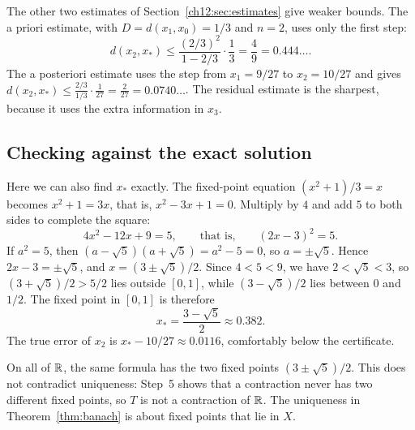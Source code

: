 The other two estimates of Section~\ref{ch12:sec:estimates} give weaker bounds. The a priori estimate, with $D=d(x_1,x_0)=1/3$ and $n=2$, uses only the first step:
\[
d(x_2,x_*)\le\frac{(2/3)^2}{1-2/3}\cdot\frac13=\frac49=0.444\ldots.
\]
The a posteriori estimate uses the step from $x_1=9/27$ to $x_2=10/27$ and gives $d(x_2,x_*)\le\frac{2/3}{1/3}\cdot\frac1{27}=\frac2{27}=0.0740\ldots$. The residual estimate is the sharpest, because it uses the extra information in $x_3$.

\subsection*{Checking against the exact solution}
Here we can also find $x_*$ exactly. The fixed-point equation $(x^2+1)/3=x$ becomes $x^2+1=3x$, that is, $x^2-3x+1=0$. Multiply by $4$ and add $5$ to both sides to complete the square:
\[
4x^2-12x+9=5,\qquad\text{that is,}\qquad(2x-3)^2=5.
\]
If $a^2=5$, then $(a-\sqrt5)(a+\sqrt5)=a^2-5=0$, so $a=\pm\sqrt5$. Hence $2x-3=\pm\sqrt5$, and $x=(3\pm\sqrt5)/2$. Since $4<5<9$, we have $2<\sqrt5<3$, so $(3+\sqrt5)/2>5/2$ lies outside $[0,1]$, while $(3-\sqrt5)/2$ lies between $0$ and $1/2$. The fixed point in $[0,1]$ is therefore
\[
x_*=\frac{3-\sqrt5}{2}\approx0.382.
\]
The true error of $x_2$ is $x_*-10/27\approx0.0116$, comfortably below the certificate.

On all of $\mathbb R$, the same formula has the two fixed points $(3\pm\sqrt5)/2$. This does not contradict uniqueness: Step~5 shows that a contraction never has two different fixed points, so $T$ is not a contraction of $\mathbb R$. The uniqueness in Theorem~\ref{thm:banach} is about fixed points that lie in $X$.

